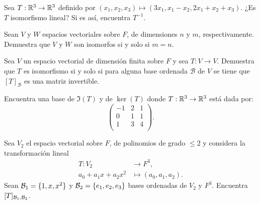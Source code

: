 \documentclass[12pt,a4paper]{book}
\newcommand{\llaves}[1]{\{#1\}}
\begin{document}
    \begin{ejercicio}
        Sea $T: \mathbb{R}^{3} \to \mathbb{R}^{3}$ definido por $(x_{1}, x_{2}, x_{3}) \mapsto (3x_{1}, x_{1} - x_{2}, 2x_{1} + x_{2} + x_{3})$. ¿Es $T$ isomorfismo lineal? Si es así, encuentra $T^{-1}$.
    \end{ejercicio}

    \begin{ejercicio}
        Sean $V$ y $W$ espacios vectoriales sobre $F$, de dimensiones $n$ y $m$, respectivamente. Demuestra que $V$ y $W$ son isomorfos si y solo si $m = n$.
    \end{ejercicio}

    \begin{ejercicio}
        Sea $V$ un espacio vectorial de dimensión finita sobre $F$ y sea $T: V \to V$. Demuestra que $T$ es isomorfismo si y solo si para alguna base ordenada $\mathcal{B}$ de $V$ se tiene que $[T]_{\mathcal{B}}$ es una matriz invertible.
    \end{ejercicio}

    \begin{ejercicio}
        Encuentra una base de $\Im(T)$ y de $\ker(T)$ donde $T: \mathbb{R}^{3} \to \mathbb{R}^{3}$ está dada por:
        \begin{equation*}
        \begin{pmatrix}
            -1 & 2 & 1\\
            0 & 1 & 1\\
            1 & 3 & 4\\
        \end{pmatrix}.
        \end{equation*}
    \end{ejercicio}

    \begin{ejercicio}
        Sea $V_{2}$ el espacio vectorial sobre $F$, de polinomios de grado $\leq 2$ y considera la transformación lineal
        \begin{align*}
            T : V_{2} & \to F^{3},\\
            a_{0} + a_{1}x + a_{2}x^{2} & \mapsto (a_{0}, a_{1}, a_{2}).
        \end{align*}
        Sean $\BB_{1} = \llaves{1, x, x^{2}}$ y $\BB_{2} = \llaves{e_{1}, e_{2}, e_{3}}$ bases ordenadas de $V_{2}$ y $F^{3}$. Encuentra $[T]_{\mathcal{B}_{1}, \mathcal{B}_{2}}$.
    \end{ejercicio}
\end{document}
